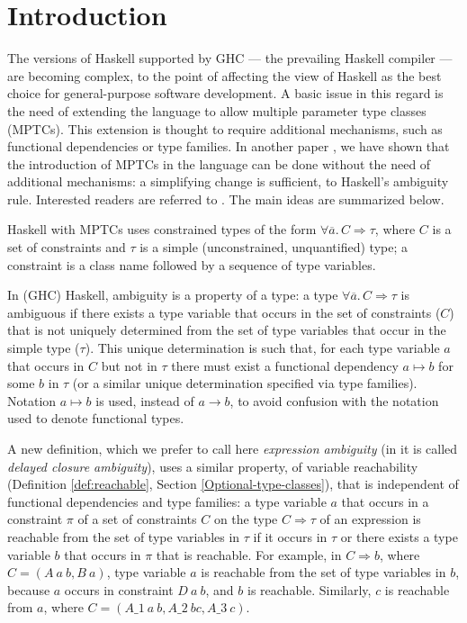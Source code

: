 \section{Introduction}
\label{sec:intro}

The versions of Haskell supported by GHC \cite{GHC} --- the prevailing
Haskell compiler --- are becoming complex, to the point of affecting
the view of Haskell as the best choice for general-purpose software
development. A basic issue in this regard is the need of extending the
language to allow multiple parameter type classes (MPTCs). This
extension is thought to require additional mechanisms, such as
functional dependencies or type families. In another paper
\cite{JBCS-Ambiguity-and-constrained-polymorphism}, we have shown that
the introduction of MPTCs in the language can be done without the need
of additional mechanisms: a simplifying change is sufficient, to
Haskell's ambiguity rule. Interested readers are referred to
\cite{JBCS-Ambiguity-and-constrained-polymorphism}. The main ideas are
summarized below.

Haskell with MPTCs uses constrained types of the form $\forall
\overline{a}.\,C \Rightarrow \tau$, where $C$ is a set of constraints
and $\tau$ is a simple (unconstrained, unquantified) type; a
constraint is a class name followed by a sequence of type variables.

In (GHC) Haskell, ambiguity is a property of a type: a type $\forall
\overline{a}.\,C \Rightarrow \tau$ is ambiguous if there exists a type
variable that occurs in the set of constraints ($C$) that is not
uniquely determined from the set of type variables that occur in the
simple type ($\tau$). This unique determination is such that, for each
type variable $a$ that occurs in $C$ but not in $\tau$ there must
exist a functional dependency $a \mapsto b$ for some $b$ in $\tau$ (or
a similar unique determination specified via type families). Notation
$a \mapsto b$ is used, instead of $a \rightarrow b$, to avoid
confusion with the notation used to denote functional types.

A new definition, which we prefer to call here {\em expression
  ambiguity\/} (in \cite{JBCS-Ambiguity-and-constrained-polymorphism}
it is called {\em delayed closure ambiguity\/}), uses a similar
property, of variable reachability (Definition \ref{def:reachable},
Section \ref{Optional-type-classes}), that is independent of
functional dependencies and type families: a type variable $a$ that
occurs in a constraint $\pi$ of a set of constraints $C$ on the type
$C\Rightarrow\tau$ of an expression is reachable from the set of type
variables in $\tau$ if it occurs in $\tau$ or there exists a type
variable $b$ that occurs in $\pi$ that is reachable. For example, in
$C \Rightarrow b$, where $C=(A\: a\: b, B\: a)$, type variable $a$ is
reachable from the set of type variables in $b$, because $a$ occurs in
constraint $D\: a\: b$, and $b$ is reachable. Similarly, $c$ is
reachable from $a$, where $C=(A\_1\: a\: b, A\_2\: b c, A\_3\: c)$.

